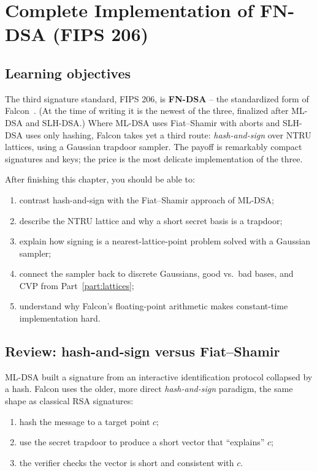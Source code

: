 \chapter{Complete Implementation of FN-DSA (FIPS 206)}
\label{ch:fndsa}

\section{Learning objectives}

The third signature standard, FIPS 206, is \textbf{FN-DSA} -- the standardized form of Falcon~\cite{fips206,falcon2020}. (At the time of writing it is the newest of the three, finalized after ML-DSA and SLH-DSA.) Where ML-DSA uses Fiat--Shamir with aborts and SLH-DSA uses only hashing, Falcon takes yet a third route: \emph{hash-and-sign} over NTRU lattices, using a Gaussian trapdoor sampler. The payoff is remarkably compact signatures and keys; the price is the most delicate implementation of the three.

After finishing this chapter, you should be able to:

\begin{enumerate}
  \item contrast hash-and-sign with the Fiat--Shamir approach of ML-DSA;
  \item describe the NTRU lattice and why a short secret basis is a trapdoor;
  \item explain how signing is a nearest-lattice-point problem solved with a Gaussian sampler;
  \item connect the sampler back to discrete Gaussians, good vs.\ bad bases, and CVP from Part~\ref{part:lattices};
  \item understand why Falcon's floating-point arithmetic makes constant-time implementation hard.
\end{enumerate}

\section{Review: hash-and-sign versus Fiat--Shamir}

ML-DSA built a signature from an interactive identification protocol collapsed by a hash. Falcon uses the older, more direct \emph{hash-and-sign} paradigm, the same shape as classical RSA signatures:

\begin{enumerate}
  \item hash the message to a target point $c$;
  \item use the secret trapdoor to produce a short vector that ``explains'' $c$;
  \item the verifier checks the vector is short and consistent with $c$.
\end{enumerate}

